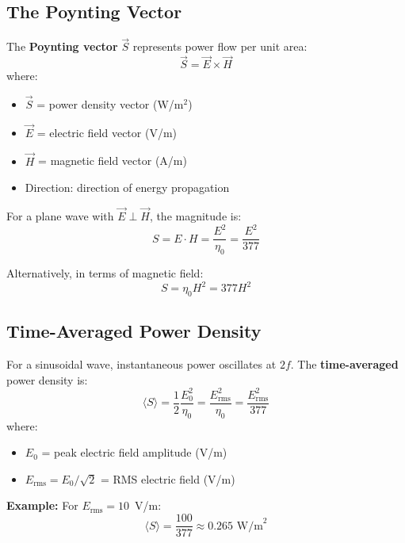 \subsection{The Poynting Vector}

The \textbf{Poynting vector} $\vec{S}$ represents power flow per unit area:
\begin{equation}
\vec{S} = \vec{E} \times \vec{H}
\label{eq:poynting-vector}
\end{equation}
where:
\begin{itemize}
\item $\vec{S}$ = power density vector (W/m$^2$)
\item $\vec{E}$ = electric field vector (V/m)
\item $\vec{H}$ = magnetic field vector (A/m)
\item Direction: direction of energy propagation
\end{itemize}

For a plane wave with $\vec{E} \perp \vec{H}$, the magnitude is:
\begin{equation}
S = E \cdot H = \frac{E^2}{\eta_0} = \frac{E^2}{377}
\label{eq:power-density-e}
\end{equation}

Alternatively, in terms of magnetic field:
\begin{equation}
S = \eta_0 H^2 = 377 H^2
\label{eq:power-density-h}
\end{equation}

\subsection{Time-Averaged Power Density}

For a sinusoidal wave, instantaneous power oscillates at $2f$. The \textbf{time-averaged} power density is:
\begin{equation}
\langle S \rangle = \frac{1}{2} \frac{E_0^2}{\eta_0} = \frac{E_{\text{rms}}^2}{\eta_0} = \frac{E_{\text{rms}}^2}{377}
\label{eq:power-density-rms}
\end{equation}
where:
\begin{itemize}
\item $E_0$ = peak electric field amplitude (V/m)
\item $E_{\text{rms}} = E_0/\sqrt{2}$ = RMS electric field (V/m)
\end{itemize}

\textbf{Example:} For $E_{\text{rms}} = 10$~V/m:
\[
\langle S \rangle = \frac{100}{377} \approx 0.265 \text{~W/m}^2
\]

